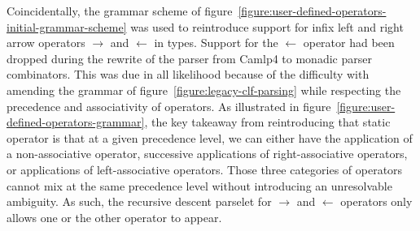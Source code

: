 Coincidentally, the grammar scheme of figure~\ref{figure:user-defined-operators-initial-grammar-scheme} was used to reintroduce support for infix left and right arrow operators $\rightarrow$ and $\leftarrow$ in \LF types.
Support for the $\leftarrow$ operator had been dropped during the rewrite of the parser from \textsf{Camlp4} to monadic parser combinators.
This was due in all likelihood because of the difficulty with amending the grammar of figure~\ref{figure:legacy-clf-parsing} while respecting the precedence and associativity of operators.
As illustrated in figure~\ref{figure:user-defined-operators-grammar}, the key takeaway from reintroducing that static operator is that at a given precedence level, we can either have the application of a non-associative operator, successive applications of right-associative operators, or applications of left-associative operators.
Those three categories of operators cannot mix at the same precedence level without introducing an unresolvable ambiguity.
As such, the recursive descent parselet for $\rightarrow$ and $\leftarrow$ operators only allows one or the other operator to appear.

